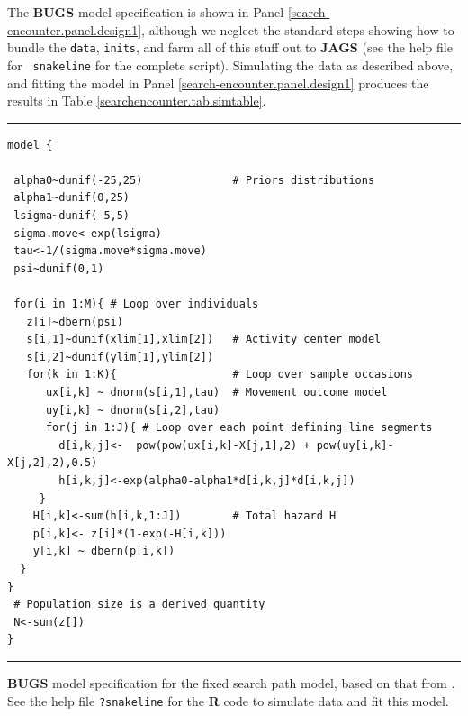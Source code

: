 The {\bf BUGS} model specification is shown in Panel
\ref{search-encounter.panel.design1}, although we neglect the standard
steps showing how to
bundle the \mbox{\tt data}, \mbox{\tt inits}, and farm
all of this stuff out to {\bf JAGS} (see the help file for \mbox{\tt
  snakeline} for the complete script).
Simulating the data as described above, and fitting the model in Panel
\ref{search-encounter.panel.design1} produces the results in Table
\ref{searchencounter.tab.simtable}.

\begin{panel}[htp]
\centering
\rule[0.15in]{\textwidth}{.03in}
{\small
\begin{verbatim}
model {

 alpha0~dunif(-25,25)              # Priors distributions
 alpha1~dunif(0,25)
 lsigma~dunif(-5,5)
 sigma.move<-exp(lsigma)
 tau<-1/(sigma.move*sigma.move)
 psi~dunif(0,1)

 for(i in 1:M){ # Loop over individuals
   z[i]~dbern(psi)
   s[i,1]~dunif(xlim[1],xlim[2])   # Activity center model
   s[i,2]~dunif(ylim[1],ylim[2])
   for(k in 1:K){                  # Loop over sample occasions
      ux[i,k] ~ dnorm(s[i,1],tau)  # Movement outcome model
      uy[i,k] ~ dnorm(s[i,2],tau)
      for(j in 1:J){ # Loop over each point defining line segments
        d[i,k,j]<-  pow(pow(ux[i,k]-X[j,1],2) + pow(uy[i,k]-X[j,2],2),0.5)
        h[i,k,j]<-exp(alpha0-alpha1*d[i,k,j]*d[i,k,j])
     }
    H[i,k]<-sum(h[i,k,1:J])        # Total hazard H
    p[i,k]<- z[i]*(1-exp(-H[i,k]))
    y[i,k] ~ dbern(p[i,k])
  }
}
 # Population size is a derived quantity
 N<-sum(z[])
}
\end{verbatim}
}
\rule[-0.15in]{\textwidth}{.03in}
\caption{
{\bf BUGS} model specification for the fixed search path model, based
on that from \citet{royle_etal:2011mee}.
See the
help file \mbox{\tt ?snakeline} for the {\bf R} code to simulate data
and fit this model.
}
\label{search-encounter.panel.design1}
\end{panel}




